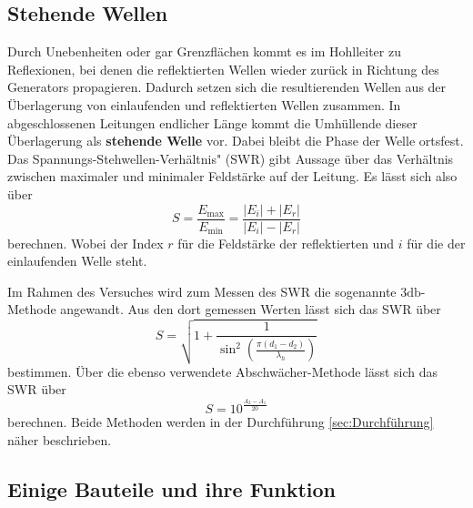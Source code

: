 \subsection{Stehende Wellen}

Durch Unebenheiten oder gar Grenzflächen kommt es im Hohlleiter zu Reflexionen, bei denen die reflektierten Wellen wieder zurück in Richtung des Generators propagieren. Dadurch setzen sich die resultierenden Wellen aus der Überlagerung von einlaufenden und reflektierten Wellen zusammen. In abgeschlossenen Leitungen endlicher Länge kommt die Umhüllende dieser Überlagerung als \textbf{stehende Welle} vor. Dabei bleibt die Phase der Welle ortsfest. Das \glqq Spannungs-Stehwellen-Verhältnis" (SWR) gibt Aussage über das Verhältnis zwischen maximaler und minimaler Feldstärke auf der Leitung. Es lässt sich also über
\begin{equation}
    S = \frac{E_{\text{max}}}{E_{\text{min}}} = \frac{|E_i|+|E_r|}{|E_i|-|E_r|}
\end{equation}
berechnen. Wobei der Index $r$ für die Feldstärke der reflektierten und $i$ für die der einlaufenden Welle steht.


Im Rahmen des Versuches wird zum Messen des SWR die sogenannte \glqq $3 \si{\decibel}$\grqq{}- Methode angewandt. Aus den dort gemessen Werten lässt sich das SWR über
\begin{equation}
    \label{eqn:3db}
    S = \sqrt{1+\frac{1}{\sin^2\left(\frac{\pi(d_1-d_2)}{\lambda_h}\right)}}
\end{equation}
bestimmen. 
Über die ebenso verwendete \glqq Abschwächer-Methode\grqq{} lässt sich das SWR über
\begin{equation}
    \label{eqn:abschw}
    S = 10^{\frac{A_2-A_1}{20}}
\end{equation}
berechnen.
Beide Methoden werden in der Durchführung \ref{sec:Durchführung} näher beschrieben.


\subsection{Einige Bauteile und ihre Funktion}

